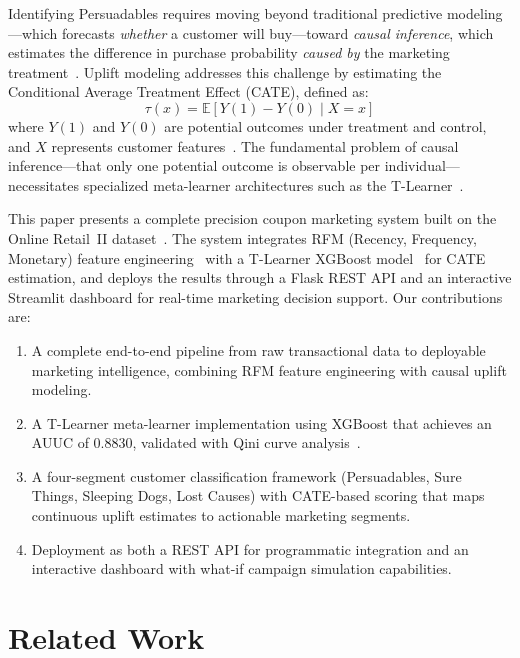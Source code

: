 \documentclass[11pt,a4paper,twoside]{article}
\begin{document}
Identifying Persuadables requires moving beyond traditional predictive modeling---which forecasts \textit{whether} a customer will buy---toward \textit{causal inference}, which estimates the difference in purchase probability \textit{caused by} the marketing treatment~\cite{rubin1974, kunzel2019}. Uplift modeling addresses this challenge by estimating the Conditional Average Treatment Effect (CATE), defined as:
\begin{equation}
\tau(x) = \mathbb{E}[Y(1) - Y(0) \mid X = x]
\label{eq:cate}
\end{equation}
where $Y(1)$ and $Y(0)$ are potential outcomes under treatment and control, and $X$ represents customer features~\cite{kunzel2019}. The fundamental problem of causal inference---that only one potential outcome is observable per individual---necessitates specialized meta-learner architectures such as the T-Learner~\cite{kunzel2019, gutierrez2017}.

This paper presents a complete precision coupon marketing system built on the Online Retail~II dataset~\cite{chen2015}. The system integrates RFM (Recency, Frequency, Monetary) feature engineering~\cite{bult1995, hughes1994} with a T-Learner XGBoost model~\cite{chen2016xgboost} for CATE estimation, and deploys the results through a Flask REST API and an interactive Streamlit dashboard for real-time marketing decision support. Our contributions are:

\begin{enumerate}
    \item A complete end-to-end pipeline from raw transactional data to deployable marketing intelligence, combining RFM feature engineering with causal uplift modeling.
    \item A T-Learner meta-learner implementation using XGBoost that achieves an AUUC of 0.8830, validated with Qini curve analysis~\cite{radcliffe2011, rzepakowski2012}.
    \item A four-segment customer classification framework (Persuadables, Sure Things, Sleeping Dogs, Lost Causes) with CATE-based scoring that maps continuous uplift estimates to actionable marketing segments.
    \item Deployment as both a REST API for programmatic integration and an interactive dashboard with what-if campaign simulation capabilities.
\end{enumerate}

\section{Related Work}
\end{document}
